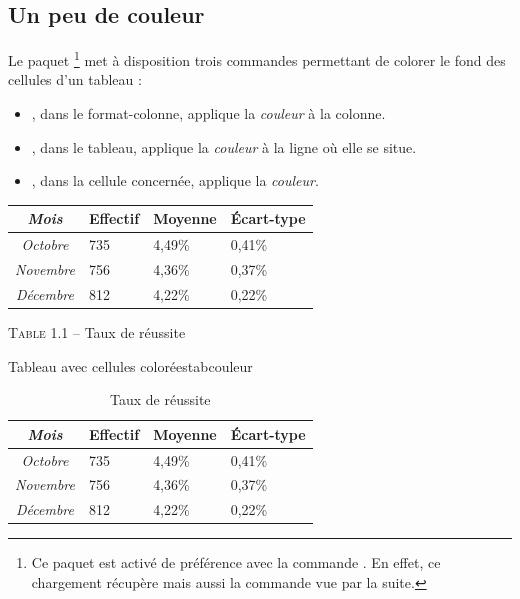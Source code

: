 \subsection{Un peu de couleur} \label{tableaucouleur} 

Le paquet \footnote{Ce paquet est activé de préférence avec la commande . En effet, ce chargement récupère  mais aussi la commande  vue par la suite.} met à disposition trois commandes permettant de colorer le fond des cellules d'un tableau :
\begin{itemize}
\item {}, dans le format-colonne, applique la \emph{couleur} à la colonne.
\item {}, dans le tableau, applique la \emph{couleur} à la ligne où elle se situe.
\item {}, dans la cellule concernée, applique  la \emph{couleur}.
\end{itemize}

\begin{codedoublevrai}
\centering
\begin{tabular}{|>{\columncolor{bleu8}\slshape}c||m{2cm}<{\centering}|
m{2cm}<{\centering}|m{2cm}<{\centering}|}
\hline \rowcolor{bleu7}  
Mois       & Effectif  & Moyenne                   & \'{E}cart-type  \\ \hline \hline
Octobre    & 735       & \cellcolor{orange8}4,49\% & 0,41\%          \\ \hline
Novembre   & 756       & 4,36\%                    & 0,37\%          \\ \hline
Décembre   & 812       & 4,22\%                    & 0,22\%          \\ \hline
\end{tabular}
\par\vspace{0.8\baselineskip} \textsc{Table 1.1} -- Taux de réussite
\end{codedoublevrai}

\begin{codedoublefaux}{Tableau avec cellules colorées}{tabcouleur}
\begin{table}[!ht]
\centering
\begin{tabular}{|>{\columncolor{bleu8}\slshape}c||m{2cm}<{\centering}|
m{2cm}<{\centering}|m{2cm}<{\centering}|}
\hline \rowcolor{bleu7}  
Mois       & Effectif  & Moyenne                   & \'{E}cart-type  \\ \hline \hline
Octobre    & 735       & \cellcolor{orange8}4,49\% & 0,41\%          \\ \hline
Novembre   & 756       & 4,36\%                    & 0,37\%          \\ \hline
Décembre   & 812       & 4,22\%                    & 0,22\%          \\ \hline
\end{tabular}
\caption{Taux de réussite}
\end{table}
\end{codedoublefaux}


